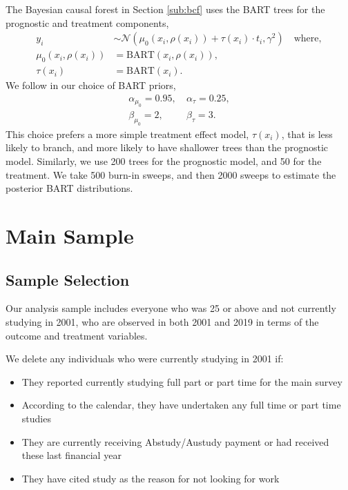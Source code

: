 \documentclass[12pt, a4paper]{article}
\begin{document}
The Bayesian causal forest in Section \ref{sub:bcf} uses the BART trees
for the prognostic and treatment components,
\begin{align*}
y_i &\sim \mathcal{N}\!\left(
  \mu_0(x_i, \rho(x_i)) + \tau(x_i)\cdot t_i, 
  \gamma^2\right) 
  \quad\textrm{where}, \\
\mu_0(x_i, \rho(x_i)) &= \textrm{BART}(x_i, \rho(x_i)), \\
\tau(x_i) &= \textrm{BART}(x_i).
\end{align*}
We follow \cite{hahn2020} in our choice of BART priors,
\begin{align*}
  \alpha_{\mu_0} = 0.95,&~
  \alpha_{\tau} = 0.25, \\
  \beta_{\mu_0} = 2,&~
  \beta_{\tau} = 3.
\end{align*}
This choice prefers a more simple treatment effect model, $\tau(x_i)$, that is
less likely to branch, and more likely to have shallower trees 
than the prognostic model. Similarly, we use 200 trees for the prognostic model,
and 50 for the treatment. We take 500 burn-in sweeps, and then 2000 sweeps
to estimate the posterior BART distributions.

\clearpage

\renewcommand{\appendixname}{Online Publication: Appendix}

\section{Main Sample}
\label{app:main}

\subsection{Sample Selection}

Our analysis sample includes everyone who was 25 or above and not currently studying in 2001, who are observed in both 2001 and 2019 in terms of the outcome and treatment variables. 

We delete any individuals who were currently studying in 2001 if:
\begin{itemize}
  \item They reported currently studying full part or part time for the main survey 
  \item According to the calendar, they have undertaken any full time or part time studies
  \item They are currently receiving Abstudy/Austudy payment or had received these last financial year 
  \item They have cited study as the reason for not looking for work 
\end{itemize}
\end{document}

